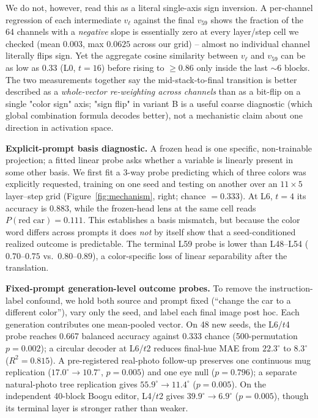 \documentclass[10pt,twocolumn,letterpaper]{article}
\begin{document}
We do not, however, read this as a literal single-axis sign inversion.
A per-channel regression of each intermediate $v_\ell$ against the final
$v_{59}$ shows the fraction of the 64 channels with a \emph{negative}
slope is essentially zero at every layer/step cell we checked
(mean $0.003$, max $0.0625$ across our grid) -- almost no individual
channel literally flips sign. Yet the aggregate cosine similarity
between $v_\ell$ and $v_{59}$ can be as low as $0.33$ (L0, $t{=}16$)
before rising to $\ge 0.86$ only inside the last $\sim$6 blocks. The two
measurements together say the mid-stack-to-final transition is better
described as a \emph{whole-vector re-weighting across channels} than as
a bit-flip on a single "color sign" axis; "sign flip" in variant B is a
useful coarse diagnostic (which global combination formula decodes
better), not a mechanistic claim about one direction in activation
space.

\textbf{Explicit-prompt basis diagnostic.} A frozen head is one specific,
non-trainable projection; a fitted linear probe asks whether a variable is
linearly present in some other basis. We first fit a 3-way probe predicting
which of three colors was explicitly requested, training on one seed and
testing on another over an $11\times5$ layer--step grid
(Figure~\ref{fig:mechanism}, right; chance $=0.333$). At L6, $t{=}4$ its
accuracy is $0.883$, while the frozen-head lens at the same cell reads
$P(\text{red car})=0.111$. This establishes a basis mismatch, but because
the color word differs across prompts it does \emph{not} by itself show
that a seed-conditioned realized outcome is predictable. The terminal L59
probe is lower than L48--L54 ($0.70$--$0.75$ vs.\ $0.80$--$0.89$), a
color-specific loss of linear separability after the translation.

\textbf{Fixed-prompt generation-level outcome probes.} To remove the
instruction-label confound, we hold both source and prompt fixed
(``change the car to a different color''), vary only the seed, and label
each final image post hoc. Each generation contributes one mean-pooled
vector. On 48 new seeds, the L6/$t$4 probe reaches 0.667 balanced accuracy
against 0.333 chance (500-permutation $p=0.002$); a circular decoder at
L6/$t$2 reduces final-hue MAE from $22.3^\circ$ to $8.3^\circ$
($R^2=0.815$). A pre-registered real-photo follow-up preserves one
continuous mug replication ($17.0^\circ\to10.7^\circ$, $p=0.005$) and one
eye null ($p=0.796$); a separate natural-photo tree replication gives
$55.9^\circ\to11.4^\circ$ ($p=0.005$). On the independent 40-block Boogu
editor, L4/$t$2 gives $39.9^\circ\to6.9^\circ$ ($p=0.005$), though its
terminal layer is stronger rather than weaker.
\end{document}
